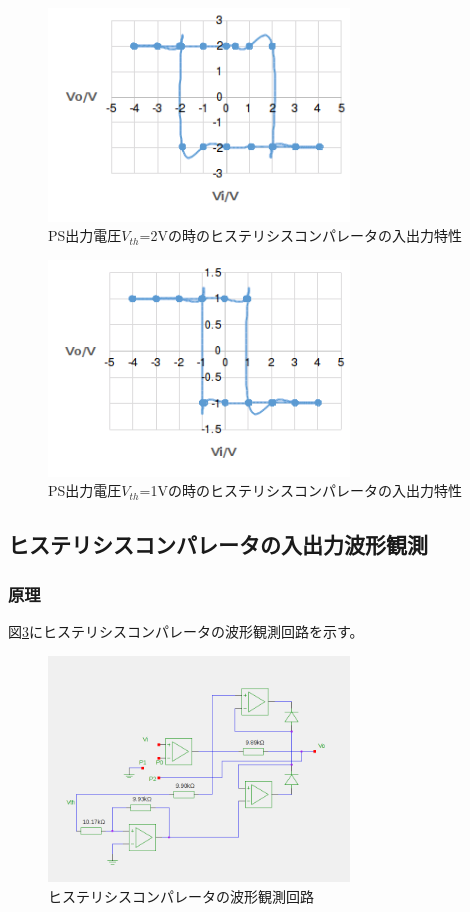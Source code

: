 \documentclass[11pt,a4j]{jsarticle}
\begin{document}
    \begin{figure}[htbp]
  \centering
  \includegraphics[width=8cm,clip]{1_2_histeri_Vth2.png}
  \caption{PS出力電圧$V_{th}$=2Vの時のヒステリシスコンパレータの入出力特性}
  \label{fig:1_2_histeri_Vth2}
 \end{figure}%
    
 \begin{figure}[htbp]
  \centering
  \includegraphics[width=8cm,clip]{1_2_histeri_Vth1.png}
  \caption{PS出力電圧$V_{th}$=1Vの時のヒステリシスコンパレータの入出力特性}
  \label{fig:1_2_histeri_Vth1}
 \end{figure}%
    
    
    
  \subsection{ヒステリシスコンパレータの入出力波形観測}
   \subsubsection{原理}
    
    図\ref{fig:histeri_wave}にヒステリシスコンパレータの波形観測回路を示す。
    
    \begin{figure}[htbp]
  \centering
  \includegraphics[width=8cm,clip]{histeri_wave.png}
  \caption{ヒステリシスコンパレータの波形観測回路}
  \label{fig:histeri_wave}
 \end{figure}%
    
\end{document}
